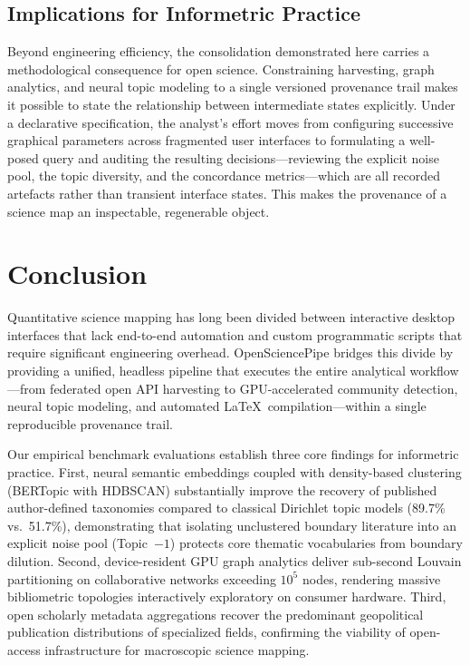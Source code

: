 \documentclass[preprint,12pt]{elsarticle}
\begin{document}
\subsection{Implications for Informetric Practice}
Beyond engineering efficiency, the consolidation demonstrated here carries a methodological consequence for open science. Constraining harvesting, graph analytics, and neural topic modeling to a single versioned provenance trail makes it possible to state the relationship between intermediate states explicitly. Under a declarative specification, the analyst's effort moves from configuring successive graphical parameters across fragmented user interfaces to formulating a well-posed query and auditing the resulting decisions---reviewing the explicit noise pool, the topic diversity, and the concordance metrics---which are all recorded artefacts rather than transient interface states. This makes the provenance of a science map an inspectable, regenerable object.

\section{Conclusion}
\label{sec:conclusion}
Quantitative science mapping has long been divided between interactive desktop interfaces that lack end-to-end automation and custom programmatic scripts that require significant engineering overhead. OpenSciencePipe bridges this divide by providing a unified, headless pipeline that executes the entire analytical workflow---from federated open API harvesting to GPU-accelerated community detection, neural topic modeling, and automated \LaTeX\ compilation---within a single reproducible provenance trail.

Our empirical benchmark evaluations establish three core findings for informetric practice. First, neural semantic embeddings coupled with density-based clustering (BERTopic with HDBSCAN) substantially improve the recovery of published author-defined taxonomies compared to classical Dirichlet topic models (89.7\% vs.\ 51.7\%), demonstrating that isolating unclustered boundary literature into an explicit noise pool (Topic~$-1$) protects core thematic vocabularies from boundary dilution. Second, device-resident GPU graph analytics deliver sub-second Louvain partitioning on collaborative networks exceeding $10^5$ nodes, rendering massive bibliometric topologies interactively exploratory on consumer hardware. Third, open scholarly metadata aggregations recover the predominant geopolitical publication distributions of specialized fields, confirming the viability of open-access infrastructure for macroscopic science mapping.
\end{document}
